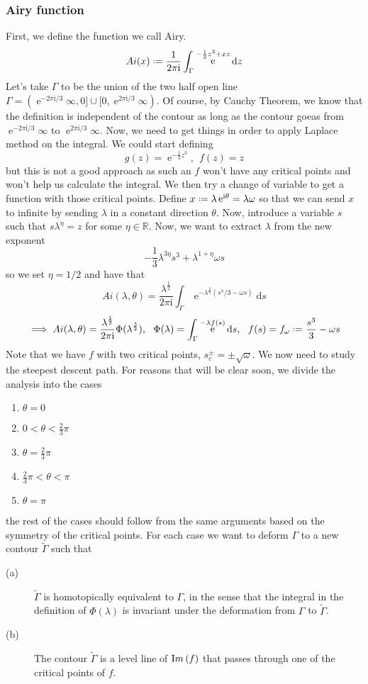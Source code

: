 \documentclass[]{report}
\renewcommand{\Im}{\mathop{\textrm Im}}
\DeclareMathOperator{\ee}{e}
\newcommand{\R}{\mathbb{R}}
\newcommand{\ii}{\mathrm{i}}
\newcommand*{\deff}{\mathrel{\vcenter{\baselineskip0.5ex \lineskiplimit0pt
			\hbox{\scriptsize.}\hbox{\scriptsize.}}}%
	=}
\newcommand{\dd}{\mathrm{d}}
\numberwithin{equation}{section} %
\begin{document}
\subsubsection{Airy function}

First, we define the function we call Airy. 
$$Ai(x) \deff \frac{1}{2\pi \ii} \int_{\Gamma} \ee^{-\frac{1}{3} z^3 + x z} \dd z$$ 
Let's take $\Gamma$ to be the union of the two half open line $\Gamma = (\ee^{-2\pi\ii / 3}\infty, 0] \cup [0, \ee^{2\pi\ii / 3} \infty)$. Of course, by Cauchy Theorem, we know that the definition is independent of the contour as long as the contour goeas from $\ee^{-2\pi\ii / 3}\infty$ to $\ee^{2\pi\ii / 3}\infty$. Now, we need to get things in order to apply Laplace method on the integral. We could start defining
$$g(z) = \ee^{-\frac{1}{3} z^3}, \ \ f(z) = z$$
but this is not a good approach as such an $f$ won't have any critical points and won't help us calculate the integral. We then try a change of variable to get a function with those critical points. Define $x \deff \lambda \ee^{\ii \theta} = \lambda \omega$ so that we can send $x$ to infinite by sending $\lambda$ in a constant direction $\theta$. Now, introduce a variable $s$ such that $s\lambda^{\eta} = z$ for some $\eta \in \R$. Now, we want to extract $\lambda$ from the new exponent 
$$-\frac{1}{3}\lambda^{3\eta}s^3 + \lambda^{1+\eta} \omega s$$
so we set $\eta = 1/2$ and have that
$$Ai(\lambda, \theta) = \frac{\lambda^{\frac{1}{2}}}{2\pi \ii} \int_{\Gamma} \ee^{-\lambda^{\frac{3}{2}}(s^3/3 - \omega s)} \dd s$$
$$\implies Ai(\lambda, \theta) = \frac{\lambda^{\frac{1}{2}}}{2\pi \ii}\Phi(\lambda^{\frac{3}{2}}) , \ \ \Phi(\lambda) = \int_{\Gamma} \ee^{-\lambda f(s)} \dd s, \ \ f(s) = f_{\omega} \deff \frac{s^3}{3} - \omega s $$ 
Note that we have $f$ with two critical points, $s_c^{\pm} = \pm \sqrt{\omega}$. We now need to study the steepest descent path. For reasons that will be clear soon, we divide the analysis into the cases
\begin{enumerate}
	\item $\theta = 0$
	\item $0< \theta < \frac{2}{3} \pi$	
	\item $\theta = \frac{2}{3} \pi$
	\item $\frac{2}{3} \pi < \theta < \pi$
	\item $\theta  = \pi$
\end{enumerate}
the rest of the cases should follow from the same arguments based on the symmetry of the critical points. For each case we want to deform $\Gamma$ to a new contour $\tilde{\Gamma}$ such that
\begin{description}
	\item[(a)] $\tilde{\Gamma}$ is homotopically equivalent to $\Gamma$, in the sense that the integral in the definition of $\Phi(\lambda)$ is invariant under the deformation from $\Gamma$ to $\tilde{\Gamma}$.
	\item[(b)] The contour $\tilde{\Gamma}$ is a level line of $\Im{(f)}$ that passes through one of the critical points of $f$.
\end{description}
\end{document}
